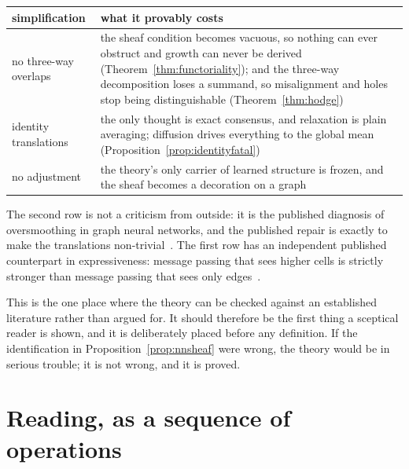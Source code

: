 \begin{center}
\begin{tabular}{@{}>{\raggedright\arraybackslash}p{}%
                  >{\raggedright\arraybackslash}p{}@{}}
\toprule
\textbf{simplification} & \textbf{what it provably costs} \\
\midrule
no three-way overlaps &
  the sheaf condition becomes vacuous, so nothing can ever obstruct and growth
  can never be derived (Theorem~\ref{thm:functoriality}); and the three-way
  decomposition loses a summand, so misalignment and holes stop being
  distinguishable (Theorem~\ref{thm:hodge})\\
\addlinespace[3pt]
identity translations &
  the only thought is exact consensus, and relaxation is plain averaging;
  diffusion drives everything to the global mean
  (Proposition~\ref{prop:identityfatal})\\
\addlinespace[3pt]
no adjustment &
  the theory's only carrier of learned structure is frozen, and the sheaf
  becomes a decoration on a graph\\
\bottomrule
\end{tabular}
\end{center}

The second row is not a criticism from outside: it is the published diagnosis
of oversmoothing in graph neural networks, and the published repair is exactly
to make the translations non-trivial~\cite{BodnarSheaf}. The first row has an
independent published counterpart in expressiveness: message passing that sees
higher cells is strictly stronger than message passing that sees only
edges~\cite{BodnarSIN}.

\begin{hon}\Hon
This is the one place where the theory can be checked against an established
literature rather than argued for. It should therefore be the first thing a
sceptical reader is shown, and it is deliberately placed before any
definition. If the identification in Proposition~\ref{prop:nnsheaf} were
wrong, the theory would be in serious trouble; it is not wrong, and it is
proved.
\end{hon}

\section{Reading, as a sequence of operations}\label{sec:reading}

